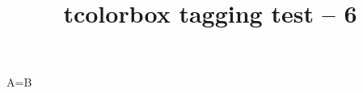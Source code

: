 \documentclass{article}
\title{tcolorbox tagging test -- 6}
\begin{document}
\begin{tcolorbox}
A=B
\end{tcolorbox}
\end{document}
